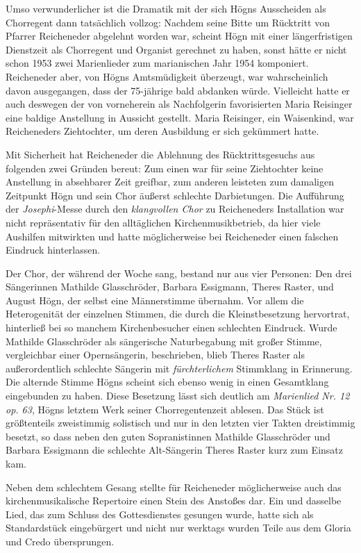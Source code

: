 \documentclass{book}
\newcommand{\zitat}[1]{\textit{#1}}
\begin{document}
Umso verwunderlicher ist die Dramatik mit der sich Högns Ausscheiden als
Chorregent dann tatsächlich vollzog: Nachdem seine Bitte um Rücktritt
von Pfarrer Reicheneder abgelehnt worden war, scheint Högn mit einer
längerfristigen Dienstzeit als Chorregent und Organist gerechnet zu
haben, sonst hätte er nicht schon 1953 zwei Marienlieder zum
marianischen Jahr 1954 komponiert. Reicheneder aber, von Högns
Amtsmüdigkeit überzeugt, war wahrscheinlich davon ausgegangen, dass der
75-jährige bald abdanken würde. Vielleicht hatte er auch deswegen der
von vorneherein als Nachfolgerin favorisierten Maria Reisinger eine
baldige Anstellung in Aussicht gestellt. Maria Reisinger, ein
Waisenkind, war Reicheneders Ziehtochter, um deren Ausbildung er sich
gekümmert hatte.

Mit Sicherheit hat Reicheneder die Ablehnung des Rücktrittsgesuchs aus
folgenden zwei Gründen bereut: Zum einen war für seine Ziehtochter
keine Anstellung in absehbarer Zeit greifbar, zum anderen leisteten zum
damaligen Zeitpunkt Högn und sein Chor äußerst schlechte Darbietungen.
Die Aufführung der \textit{Josephi}{}-Messe durch den
\zitat{klangvollen Chor} zu Reicheneders Installation war
nicht repräsentativ für den alltäglichen Kirchenmusikbetrieb, da hier
viele Aushilfen mitwirkten und hatte möglicherweise bei Reicheneder
einen falschen Eindruck hinterlassen.

Der Chor, der während der Woche sang, bestand nur aus vier Personen: Den
drei Sängerinnen Mathilde Glasschröder, Barbara Essigmann, Theres
Raster, und August Högn, der selbst eine Männerstimme übernahm. Vor
allem die Heterogenität der einzelnen Stimmen, die durch die
Kleinstbesetzung hervortrat, hinterließ bei so manchem Kirchenbesucher
einen schlechten Eindruck. Wurde Mathilde Glasschröder als sängerische
Naturbegabung mit großer Stimme, vergleichbar einer Opernsängerin,
beschrieben, blieb Theres Raster als außerordentlich schlechte Sängerin
mit \textit{fürchterlichem} Stimmklang in Erinnerung. Die alternde
Stimme Högns scheint sich ebenso wenig in einen Gesamtklang eingebunden
zu haben. Diese Besetzung lässt sich deutlich am \textit{Marienlied Nr.
12 op. 63}, Högns letztem Werk seiner Chorregentenzeit ablesen. Das
Stück ist größtenteils zweistimmig solistisch und nur in den letzten
vier Takten dreistimmig besetzt, so dass neben den guten Sopranistinnen
Mathilde Glasschröder und Barbara Essigmann die schlechte Alt-Sängerin
Theres Raster kurz zum Einsatz kam.

Neben dem schlechtem Gesang stellte für Reicheneder möglicherweise auch
das kirchenmusikalische Repertoire einen Stein des Anstoßes dar. Ein
und dasselbe Lied, das zum Schluss des Gottesdienstes gesungen wurde,
hatte sich als Standardstück eingebürgert und nicht nur werktags wurden
Teile aus dem Gloria und Credo übersprungen.
\end{document}
